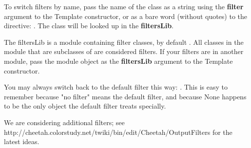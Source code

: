 To switch filters by name, pass the name of the class as a string using the
{\bf filter} argument to the Template constructor, or as a bare word (without
quotes) to the  directive: .  The
class will be looked up in the {\bf filtersLib}.

The filtersLib is a module containing filter classes, by default
.  All classes in the module that are subclasses of
 are considered filters.  If your filters are in
another module, pass the module object as the {\bf filtersLib} argument to the
Template constructor.

You may always switch back to the default filter this way:
.  This is easy to remember because "no filter" means the
default filter, and because None happens to be the only object the default
filter treats specially.

We are considering additional filters; see
http://cheetah.colorstudy.net/twiki/bin/edit/Cheetah/OutputFilters
for the latest ideas.






